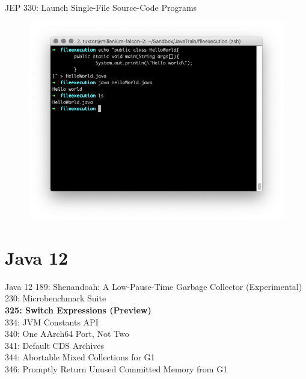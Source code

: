 \documentclass[aspectratio=169]{beamer}
\begin{document}
\begin{frame}[fragile]{JEP 330: Launch Single-File Source-Code Programs}
    \begin{figure}
        \centering
        \includegraphics[width=0.9\linewidth]{Images/jep222singlefile}
    \end{figure}
    
\end{frame}

{
    \section{Java 12}
}



\begin{frame}[fragile]{Java 12}
189: Shenandoah: A Low-Pause-Time Garbage Collector (Experimental)\\
230: Microbenchmark Suite\\
\textbf{325: Switch Expressions (Preview)}\\
334: JVM Constants API\\
340: One AArch64 Port, Not Two\\
341: Default CDS Archives\\
344: Abortable Mixed Collections for G1\\
346: Promptly Return Unused Committed Memory from G1
\end{frame}
\end{document}
